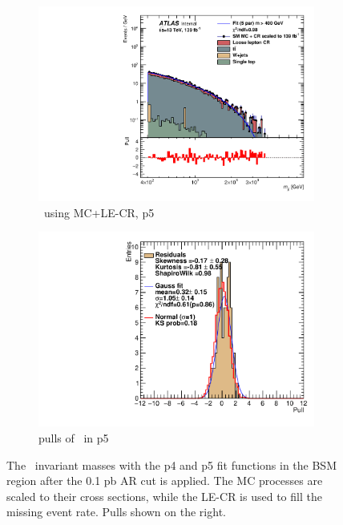 \begin{figure}[ht]
\begin{subfigure}[h]{0.38\linewidth}
    \includegraphics[scale=0.3]{figs/ch6/fit/variable_nosmooth/p5/01PB/output_SMMCplusCR_Mjj_p5.pdf}%
     \caption{\mjj \ using MC+LE-CR, p5}
     \end{subfigure}
     \hfill
    \begin{subfigure}[h]{0.4\linewidth}
    \includegraphics[scale=0.32]{figs/ch6/fit/variable_nosmooth/p5/01PB/pull_SMMCplusCR_Mjj_p5.pdf}%
    \caption{pulls of \mjj \ in p5}
    \end{subfigure}
    \caption{The \mjj \ invariant masses with the p4 and p5 fit functions in the BSM region after the 0.1 pb AR cut is applied. The MC processes are scaled to their cross sections, while the LE-CR is used to fill the missing event rate. Pulls shown on the right.}
\label{fig:mjj-fit-pulls-01pb}
\end{figure}

